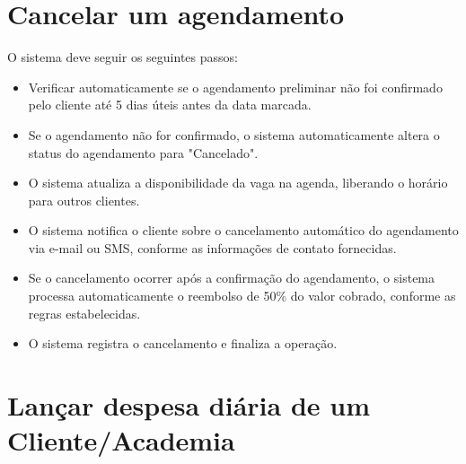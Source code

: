 \section*{Cancelar um agendamento}

O sistema deve seguir os seguintes passos:
\begin{itemize}
    \item Verificar automaticamente se o agendamento preliminar não foi confirmado pelo cliente até 5 dias úteis antes da data marcada.
    \item Se o agendamento não for confirmado, o sistema automaticamente altera o status do agendamento para "Cancelado".
    \item O sistema atualiza a disponibilidade da vaga na agenda, liberando o horário para outros clientes.
    \item O sistema notifica o cliente sobre o cancelamento automático do agendamento via e-mail ou SMS, conforme as informações de contato fornecidas.
    \item Se o cancelamento ocorrer após a confirmação do agendamento, o sistema processa automaticamente o reembolso de 50\% do valor cobrado, conforme as regras estabelecidas.
    \item O sistema registra o cancelamento e finaliza a operação.
\end{itemize}

\section*{Lançar despesa diária de um Cliente/Academia}

